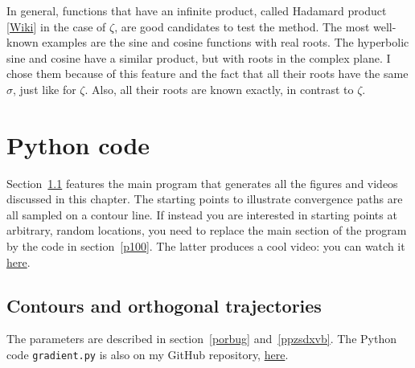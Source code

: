 \documentclass[oneside,10pt]{book}
\begin{document}
In general, functions that have an infinite product, called 
\textcolor{index}{Hadamard product} [\href{https://en.wikipedia.org/wiki/Riemann_zeta_function#Hadamard_product}{Wiki}] in the case of $\zeta$, are good candidates to test the method. The most well-known examples are the sine and cosine functions with real roots. The hyperbolic sine and cosine have a similar product, but with roots in the complex plane. I chose them because of this feature and the fact that all their roots have the same $\sigma$, just like for $\zeta$. Also, all their roots are known exactly, in contrast to $\zeta$. 



\section{Python code}\label{pc991}

Section~\ref{iudwlmn} features the main program that generates all the figures and videos discussed in this chapter.  The starting points to illustrate convergence paths are all sampled on a contour line. If instead you are interested in starting points at arbitrary, random locations, you
 need to replace the main section of the program by the code in section~\ref{p100}. The latter produces a cool video: you can watch it 
 \href{https://www.youtube.com/watch?v=pqQsLpPkvbw}{here}. 


\subsection{Contours and orthogonal trajectories}\label{iudwlmn}

The parameters are described in section~\ref{porbug} and~\ref{ppzsdxvb}. The Python code \texttt{gradient.py} is also on my 
GitHub repository, \href{https://github.com/VincentGranville/Experimental-Math-Number-Theory/blob/main/Source-Code/gradient.py}{here}. \vspace{1ex}
\end{document}
